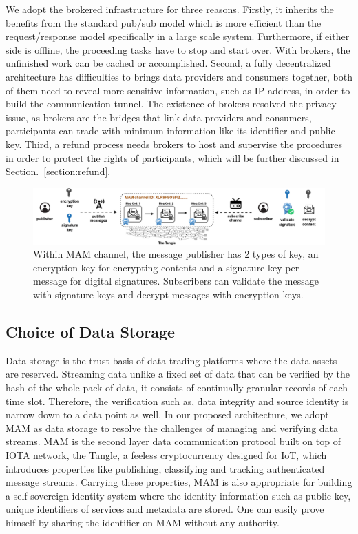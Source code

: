 \documentclass[conference]{IEEEtran}
\begin{document}
We adopt the brokered infrastructure for three reasons. Firstly, it inherits the benefits from the standard pub/sub model which is more efficient than the request/response model specifically in a large scale system. Furthermore, if either side is offline, the proceeding tasks have to stop and start over. With brokers, the unfinished work can be cached or accomplished. Second, a fully decentralized architecture has difficulties to brings data providers and consumers together, both of them need to reveal more sensitive information, such as IP address, in order to build the communication tunnel. The existence of brokers resolved the privacy issue, as brokers are the bridges that link data providers and consumers, participants can trade with minimum information like its identifier and public key. Third, a refund process needs brokers to host and supervise the procedures in order to protect the rights of participants, which will be further discussed in Section.~\ref{section:refund}.

\begin{figure}[!t]
    \centering
    \includegraphics[width=\linewidth]{channel_and_key}
    \caption{Within MAM channel, the message publisher has 2 types of key, an encryption key for encrypting contents and a signature key per message for digital signatures. Subscribers can validate the message with signature keys and decrypt messages with encryption keys.}
    \label{fig:channel_and_key}
\end{figure}


\subsection{Choice of Data Storage}
Data storage is the trust basis of data trading platforms where the data assets are reserved. Streaming data unlike a fixed set of data that can be verified by the hash of the whole pack of data, it consists of continually granular records of each time slot. Therefore, the verification such as, data integrity and source identity is narrow down to a data point as well. In our proposed architecture, we adopt MAM as data storage to resolve the challenges of managing and verifying data streams. MAM is the second layer data communication protocol built on top of IOTA\cite{IOTAwhitepaper} network, the Tangle, a feeless cryptocurrency designed for IoT, which introduces properties like publishing, classifying and tracking authenticated message streams. Carrying these properties, MAM is also appropriate for building a self-sovereign identity system where the identity information such as public key, unique identifiers of services and metadata are stored. One can easily prove himself by sharing the identifier on MAM without any authority.
\end{document}
